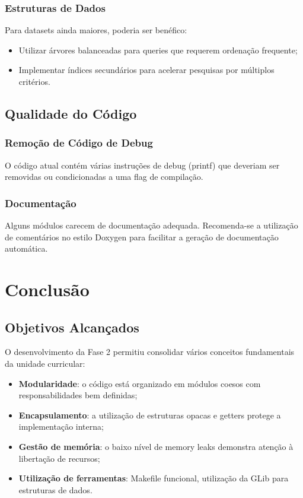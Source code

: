 \documentclass[a4paper,12pt]{scrreprt}
\begin{document}
\subsection{Estruturas de Dados}

Para datasets ainda maiores, poderia ser benéfico:
\begin{itemize}
    \item Utilizar árvores balanceadas para queries que requerem ordenação frequente;
    \item Implementar índices secundários para acelerar pesquisas por múltiplos critérios.
\end{itemize}

\section{Qualidade do Código}

\subsection{Remoção de Código de Debug}

O código atual contém várias instruções de debug (printf) que deveriam ser removidas ou condicionadas a uma flag de compilação.

\subsection{Documentação}

Alguns módulos carecem de documentação adequada. Recomenda-se a utilização de comentários no estilo Doxygen para facilitar a geração de documentação automática.

\chapter{Conclusão}

\section{Objetivos Alcançados}

O desenvolvimento da Fase 2 permitiu consolidar vários conceitos fundamentais da unidade curricular:

\begin{itemize}
    \item \textbf{Modularidade}: o código está organizado em módulos coesos com responsabilidades bem definidas;
    \item \textbf{Encapsulamento}: a utilização de estruturas opacas e getters protege a implementação interna;
    \item \textbf{Gestão de memória}: o baixo nível de memory leaks demonstra atenção à libertação de recursos;
    \item \textbf{Utilização de ferramentas}: Makefile funcional, utilização da GLib para estruturas de dados.
\end{itemize}
\end{document}
